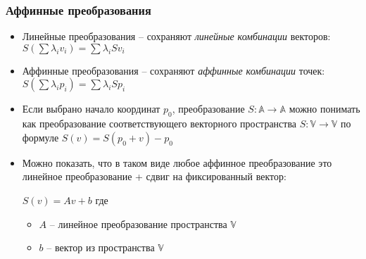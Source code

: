 \documentclass[10pt]{beamer}
\begin{document}
\begin{frame}[fragile]
\frametitle{Аффинные преобразования}
\begin{itemize}
\item Линейные преобразования -- сохраняют \textit{линейные комбинации} векторов: \begin{math}S \left(\sum \lambda_i v_i\right) = \sum \lambda_i S v_i\end{math}
\pause
\item Аффинные преобразования -- сохраняют \textit{аффинные комбинации} точек: \begin{math}S \left(\sum \lambda_i p_i\right) = \sum \lambda_i S p_i\end{math}
\pause
\item Если выбрано начало координат \begin{math}p_0\end{math}, преобразование \begin{math}S: \mathbb A \rightarrow \mathbb A\end{math} можно понимать как преобразование соответствующего векторного пространства
\begin{math}S: \mathbb V \rightarrow \mathbb V\end{math} по формуле \begin{math}S(v) = S(p_0 + v) - p_0\end{math}
\pause
\item Можно показать, что в таком виде любое аффинное преобразование это линейное преобразование + сдвиг на фиксированный вектор:

\begin{math}S(v) = Av + b\end{math}
где
\begin{itemize}
\item \begin{math}A\end{math} -- линейное преобразование пространства \begin{math}\mathbb V\end{math}
\item \begin{math}b\end{math} -- вектор из пространства \begin{math}\mathbb V\end{math}
\end{itemize}
\end{itemize}
\end{frame}
\end{document}
